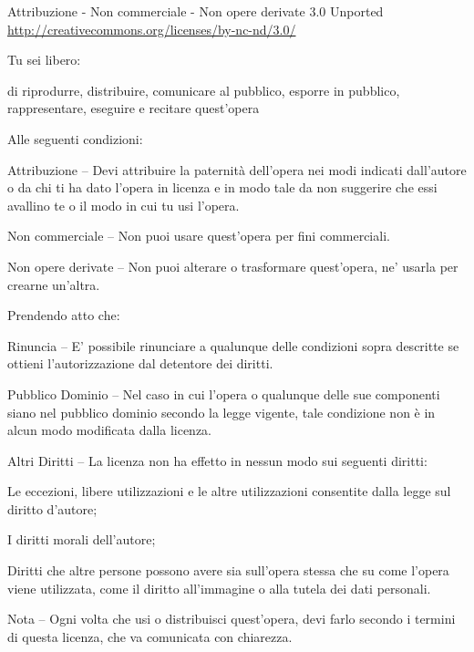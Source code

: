 
{\smaller\setlength{\parindent}{0pt}%
\raggedright\label{copyright-details}
\setlength{\parskip}{5pt}
{\centering

{\large\ccbyncnd}

Attribuzione - Non commerciale - Non opere derivate 3.0 Unported\\
\href{http://creativecommons.org/licenses/by-nc-nd/3.0/}{http://creativecommons.org/licenses/by-nc-nd/3.0/}

}

Tu sei libero:
\begin{packeditemize}
  \item di riprodurre, distribuire, comunicare al pubblico, esporre in pubblico, rappresentare, eseguire e recitare quest'opera
\end{packeditemize}


Alle seguenti condizioni:

\begin{packeditemize}
\item Attribuzione -- Devi attribuire la paternità dell'opera nei modi indicati dall'autore o da chi ti ha dato l'opera in licenza e in modo tale da non suggerire che essi avallino te o il modo in cui tu usi l'opera.
\item Non commerciale -- Non puoi usare quest'opera per fini commerciali.
\item Non opere derivate -- Non puoi alterare o trasformare quest'opera, ne' usarla per crearne un'altra.
\end{packeditemize}

Prendendo atto che:

\begin{packeditemize}
  \item Rinuncia -- E' possibile rinunciare a qualunque delle condizioni sopra descritte se ottieni l'autorizzazione dal detentore dei diritti.
  \item Pubblico Dominio -- Nel caso in cui l'opera o qualunque delle sue componenti siano nel pubblico dominio secondo la legge vigente, tale condizione non è in alcun modo modificata dalla licenza.
  \item Altri Diritti -- La licenza non ha effetto in nessun modo sui seguenti diritti:
    \begin{packeditemize}
      \item Le eccezioni, libere utilizzazioni e le altre utilizzazioni consentite dalla legge sul diritto d'autore;
      \item I diritti morali dell'autore;
      \item Diritti che altre persone possono avere sia sull'opera stessa che su come l'opera viene utilizzata, come il diritto all'immagine o alla tutela dei dati personali.
    \end{packeditemize}
  \item Nota -- Ogni volta che usi o distribuisci quest'opera, devi farlo secondo i termini di questa licenza, che va comunicata con chiarezza.
\end{packeditemize}

}
